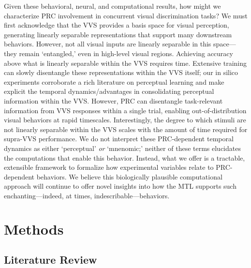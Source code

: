\documentclass[11pt]{article}
\begin{document}
Given these behavioral, neural, and computational results, how might we characterize PRC involvement in concurrent visual discrimination tasks? We must first acknowledge that the VVS provides a basis space for visual perception, generating linearly separable representations that support many downstream behaviors\cite{dicarlo2007untangling}. However, not all visual inputs are linearly separable in this space---they remain ‘entangled,' even in high-level visual regions. Achieving accuracy above what is linearly separable within the VVS requires time. Extensive training can slowly disentangle these representations within the VVS itself; our in silico experiments corroborate a rich literature on perceptual learning\cite{arcaro2017seeing, srihasam2014novel} and make explicit the temporal dynamics/advantages in consolidating perceptual information within the VVS\cite{srihasam2012behavioral}. However, PRC can disentangle task-relevant information from VVS responses within a single trial, enabling out-of-distribution visual behaviors at rapid timescales. Interestingly, the degree to which stimuli are not linearly separable within the VVS scales with the amount of time required for supra-VVS performance. We do not interpret these PRC-dependent temporal dynamics as either `perceptual' \textit{or} `mnenomic;' neither of these terms elucidates the computations that enable this behavior. Instead, what we offer is a tractable, extensible framework to formalize how experimental variables relate to PRC-dependent behaviors. We believe this biologically plausible computational approach will continue to offer novel insights into how the MTL supports such enchanting---indeed, at times, indescribable---behaviors.

\section{Methods}
\subsection{Literature Review}
\end{document}
